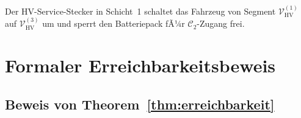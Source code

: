 ﻿\documentclass[12pt,a4paper]{article}
\begin{document}
Der HV-Service-Stecker in Schicht~1 schaltet das Fahrzeug von Segment
$\mathcal{V}_\mathrm{HV}^{(1)}$ auf $\mathcal{V}_\mathrm{HV}^{(3)}$ um und
sperrt den Batteriepack fÃ¼r $\mathcal{C}_2$-Zugang frei.

\section{Formaler Erreichbarkeitsbeweis}
\label{sec:beweis}

\subsection{Beweis von Theorem~\ref{thm:erreichbarkeit}}
\end{document}
